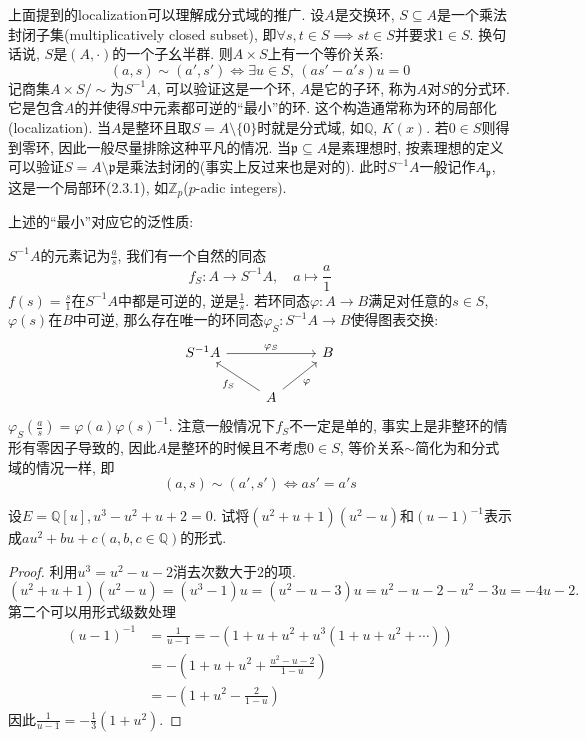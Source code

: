 \documentclass{../solutions-cn}
\begin{document}
\begin{remark}
    上面提到的localization可以理解成分式域的推广. 设$A$是交换环, $S \subseteq A$是一个乘法封闭子集(multiplicatively closed subset), 即$\forall s, t \in S \implies st \in S$并要求$1 \in S$. 换句话说, $S$是$(A, \cdot)$的一个子幺半群. 则$A \times S$上有一个等价关系:
    \[
        (a, s) \sim (a', s') \iff \exists u \in S,\, (as' - a's)u = 0
    \]
    记商集$A \times S / \sim$为$S^{-1}A$, 可以验证这是一个环, $A$是它的子环, 称为$A$对$S$的分式环. 它是包含$A$的并使得$S$中元素都可逆的“最小”的环. 这个构造通常称为环的局部化(localization). 当$A$是整环且取$S = A \setminus \{0\}$时就是分式域, 如$\mathbb{Q}$, $K(x)$. 若$0 \in S$则得到零环, 因此一般尽量排除这种平凡的情况. 当$\mathfrak{p} \subseteq A$是素理想时, 按素理想的定义可以验证$S = A \setminus \mathfrak{p}$是乘法封闭的(事实上反过来也是对的). 此时$S^{-1}A$一般记作$A_{\mathfrak{p}}$, 这是一个局部环(2.3.1), 如$\mathbb{Z}_p$($p$-adic integers).
    
    上述的“最小”对应它的泛性质:
    
    $S^{-1}A$的元素记为$\frac{a}{s}$, 我们有一个自然的同态
    \[
        f_S:A \to S^{-1}A,\quad a \mapsto \frac{a}{1}
    \]
    $f(s) = \frac{s}{1}$在$S^{-1}A$中都是可逆的, 逆是$\frac{1}{s}$. 若环同态$\varphi:A \to B$满足对任意的$s \in S$, $\varphi(s)$在$B$中可逆, 那么存在唯一的环同态$\varphi_S:S^{-1}A \to B$使得图表交换:
    \[
        \begin{tikzcd}
            S^{-1}A \arrow[rr, "\varphi_S"] &                                            & B \\
                                            & A \arrow[ru, "\varphi"'] \arrow[lu, "f_S"] &  
        \end{tikzcd}
    \]
    $\varphi_S(\frac{a}{s}) = \varphi(a)\varphi(s)^{-1}$. 注意一般情况下$f_S$不一定是单的, 事实上是非整环的情形有零因子导致的, 因此$A$是整环的时候且不考虑$0 \in S$, 等价关系$\sim$简化为和分式域的情况一样, 即
    \[
        (a, s) \sim (a', s') \iff as' = a's
    \]
\end{remark}

\begin{exercise}[习题3.1.3]
    设$E = \mathbb{Q}[u], u^3 - u^2 + u + 2 = 0$. 试将$(u^2 + u + 1)(u^2 - u)$和$(u - 1)^{-1}$表示成$au^2 + bu + c (a, b, c \in \mathbb{Q})$的形式.
\end{exercise}

\begin{proof}
    利用$u^3 = u^2 - u - 2$消去次数大于$2$的项.     
    \[
        (u^2 + u + 1)(u^2 - u) = (u^3 - 1)u = (u^2 - u - 3)u = u^2 - u - 2 - u^2 - 3u = -4u - 2.
    \]
    第二个可以用形式级数处理
    \[
    \begin{aligned}
        (u - 1)^{-1} &= \frac{1}{u - 1} = -(1 + u + u^2 + u^3(1 + u + u^2 + \cdots))\\
        &= -(1 + u + u^2 + \frac{u^2 - u - 2}{1 - u})\\
        &= -(1 + u^2 - \frac{2}{1 - u})
    \end{aligned}
    \]
    因此$\frac{1}{u - 1} = -\frac{1}{3}(1 + u^2)$.
\end{proof}
\end{document}
